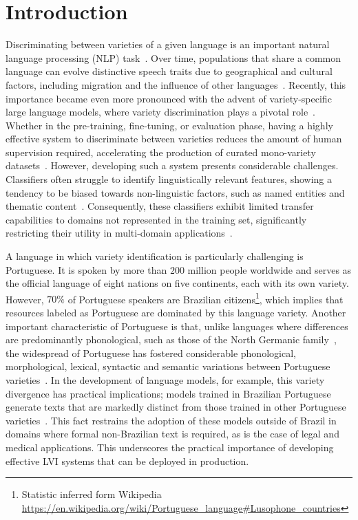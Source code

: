 \section{Introduction}
\label{sec:introduction}

Discriminating between varieties of a given language is an important natural language processing (NLP) task~\cite{joshi2024natural}. Over time, populations that share a common language can evolve distinctive speech traits due to geographical and cultural factors, including migration and the influence of other languages~\cite{Raposo_Vicente_Veloso_2021}. Recently, this importance became even more pronounced with the advent of variety-specific large language models, where variety discrimination plays a pivotal role~\cite{Rodrigues_2023}. Whether in the pre-training, fine-tuning, or evaluation phase, having a highly effective system to discriminate between varieties reduces the amount of human supervision required, accelerating the production of curated mono-variety datasets~\cite{ohman2023nordic}. However, developing such a system presents considerable challenges. Classifiers often struggle to identify linguistically relevant features, showing a tendency to be biased towards non-linguistic factors, such as named entities and thematic content~\cite{diwersy2014weakly}. Consequently, these classifiers exhibit limited transfer capabilities to domains not represented in the training set, significantly restricting their utility in multi-domain applications~\cite{lui2011cross, nguyen-etal-2021-cross-domain}.

A language in which variety identification is particularly challenging is Portuguese. It is spoken by more than $200$ million people worldwide and serves as the official language of eight nations on five continents, each with its own variety. However, $70\%$ of Portuguese speakers are Brazilian citizens\footnote{Statistic inferred form Wikipedia \url{https://en.wikipedia.org/wiki/Portuguese_language#Lusophone_countries}}, which implies that resources labeled as Portuguese are dominated by this language variety. Another important characteristic of Portuguese is that, unlike languages where differences are predominantly phonological, such as those of the North Germanic family~\cite{Holmberg2008}, the widespread of Portuguese has fostered considerable phonological, morphological, lexical, syntactic and semantic variations between Portuguese varieties~\cite{Brito2016}. In the development of language models, for example, this variety divergence has practical implications; models trained in Brazilian Portuguese generate texts that are markedly distinct from those trained in other Portuguese varieties~\cite{Rodrigues_2023}. This fact restrains the adoption of these models outside of Brazil in domains where formal non-Brazilian text is required, as is the case of legal and medical applications. This underscores the practical importance of developing effective LVI systems that can be deployed in production.

